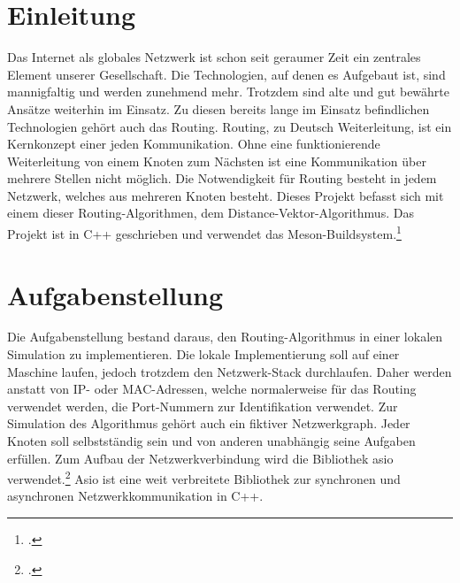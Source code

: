 \chapter{Einleitung}
Das Internet als globales Netzwerk ist schon seit geraumer Zeit ein zentrales Element unserer Gesellschaft. Die Technologien, auf denen es Aufgebaut ist, sind mannigfaltig und werden zunehmend mehr. Trotzdem sind alte und gut bewährte Ansätze weiterhin im Einsatz. Zu diesen bereits lange im Einsatz befindlichen Technologien gehört auch das Routing. Routing, zu Deutsch Weiterleitung, ist ein Kernkonzept einer jeden Kommunikation. Ohne eine funktionierende Weiterleitung von einem Knoten zum Nächsten ist eine Kommunikation über mehrere Stellen nicht möglich. Die Notwendigkeit für Routing besteht in jedem Netzwerk, welches aus mehreren Knoten besteht. Dieses Projekt befasst sich mit einem dieser Routing-Algorithmen, dem Distance-Vektor-Algorithmus. Das Projekt ist in C++ geschrieben und verwendet das Meson-Buildsystem.\footcite{meson}

\chapter{Aufgabenstellung}
Die Aufgabenstellung bestand daraus, den Routing-Algorithmus in einer lokalen Simulation zu implementieren. Die lokale Implementierung soll auf einer Maschine laufen, jedoch trotzdem den Netzwerk-Stack durchlaufen. Daher werden anstatt von IP- oder MAC-Adressen, welche normalerweise für das Routing verwendet werden, die Port-Nummern zur Identifikation verwendet. Zur Simulation des Algorithmus gehört auch ein fiktiver Netzwerkgraph. Jeder Knoten soll selbstständig sein und von anderen unabhängig seine Aufgaben erfüllen. Zum Aufbau der Netzwerkverbindung wird die Bibliothek asio verwendet.\footcite{asio} Asio ist eine weit verbreitete Bibliothek zur synchronen und asynchronen Netzwerkkommunikation in C++.